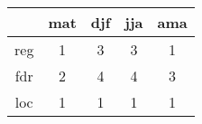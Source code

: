 \begin{tabular}{c|cccc}
& mat & djf & jja & ama \\
\hline
reg & 1 & 3 & 3 & 1 \\
fdr & 2 & 4 & 4 & 3 \\
loc & 1 & 1 & 1 & 1 \\
\end{tabular}
